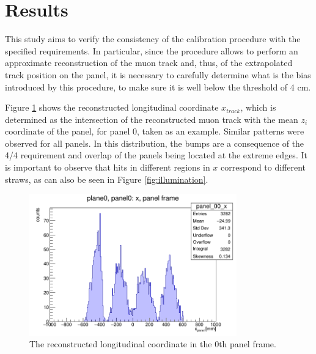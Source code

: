 \section{Results}

This study aims to verify the consistency of the 
calibration procedure with the specified requirements. In particular, since the 
procedure allows to perform an approximate reconstruction 
of the muon track and, thus, of the extrapolated track 
position on the panel, it is necessary to carefully determine 
what is the bias introduced by this procedure,  
to make sure it is well below the threshold of 4 cm.  

Figure \ref{fig:recx} shows the reconstructed 
longitudinal coordinate $x_{track}$, which is 
determined as the intersection of the reconstructed 
muon track with the mean $z_i$ coordinate of the panel, for panel 0, taken as an example.
Similar patterns were observed for all panels. In this distribution, the bumps 
are a consequence of the 4/4 requirement and overlap of the panels  
being located at the extreme edges. It is important to observe that 
hits in different regions in $x$ correspond to different 
straws, as can also be seen in Figure \ref{fig:illumination}. 

\begin{figure}[!h]
    \centering
    \includegraphics[width=0.8\textwidth]{figures/png/x_panel0.png}
    \caption[The reconstructed longitudinal coordinate in the 0th panel frame.]{The reconstructed longitudinal coordinate in the 0th panel frame.}
    \label{fig:recx}
\end{figure}

